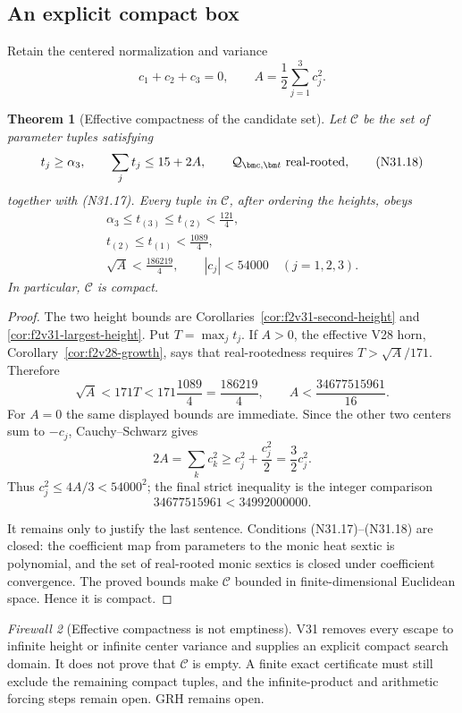 \documentclass[11pt]{article}
\newtheorem{theorem}{Theorem}[section]
\theoremstyle{definition}
\theoremstyle{remark}
\newtheorem{firewall}[theorem]{Firewall}
\begin{document}
\subsection{An explicit compact box}

Retain the centered normalization and variance
\[
 c_1+c_2+c_3=0,\qquad
 A=\frac12\sum_{j=1}^3c_j^2.
 \tag{N31.17}
\]

\begin{theorem}[Effective compactness of the candidate set]
\label{thm:f2v31-effective-compactness}
Let \(\mathcal C\) be the set of parameter tuples satisfying
\[
 t_j\geq\alpha_3,\qquad
 \sum_jt_j\leq15+2A,\qquad
 \mathcal Q_{\bm c,\bm t}\ \hbox{real-rooted},
 \tag{N31.18}
\]
together with \textup{(N31.17)}.  Every tuple in \(\mathcal C\), after
ordering the heights, obeys
\[
 \boxed{
 \begin{gathered}
 \alpha_3\leq t_{(3)}\leq t_{(2)}<\frac{121}{4},\\
 t_{(2)}\leq t_{(1)}<\frac{1089}{4},\\
 \sqrt A<\frac{186219}{4},\qquad |c_j|<54000\quad(j=1,2,3).
 \end{gathered}}
 \tag{N31.19}
\]
In particular, \(\mathcal C\) is compact.
\end{theorem}

\begin{proof}
The two height bounds are
Corollaries~\ref{cor:f2v31-second-height} and
\ref{cor:f2v31-largest-height}.  Put \(T=\max_jt_j\).
If \(A>0\), the effective V28 horn, Corollary~\ref{cor:f2v28-growth},
says that real-rootedness requires \(T>\sqrt A/171\).  Therefore
\[
 \sqrt A<171T<171\frac{1089}{4}=\frac{186219}{4},
 \qquad
 A<\frac{34677515961}{16}.
 \tag{N31.20}
\]
For \(A=0\) the same displayed bounds are immediate.  Since the other
two centers sum to \(-c_j\), Cauchy--Schwarz gives
\[
 2A=\sum_kc_k^2\geq c_j^2+\frac{c_j^2}{2}
 =\frac32c_j^2.
 \tag{N31.21}
\]
Thus \(c_j^2\leq4A/3<54000^2\); the final strict inequality is the
integer comparison
\[
 34677515961<34992000000.
 \tag{N31.22}
\]

It remains only to justify the last sentence.  Conditions
\textup{(N31.17)}--\textup{(N31.18)} are closed: the coefficient map
from parameters to the monic heat sextic is polynomial, and the set of
real-rooted monic sextics is closed under coefficient convergence.
The proved bounds make \(\mathcal C\) bounded in finite-dimensional
Euclidean space.  Hence it is compact.
\end{proof}

\begin{firewall}[Effective compactness is not emptiness]
\label{fire:f2v31}
V31 removes every escape to infinite height or infinite center variance
and supplies an explicit compact search domain.  It does not prove that
\(\mathcal C\) is empty.  A finite exact certificate must still exclude
the remaining compact tuples, and the infinite-product and arithmetic
forcing steps remain open.  GRH remains open.
\end{firewall}
\end{document}
